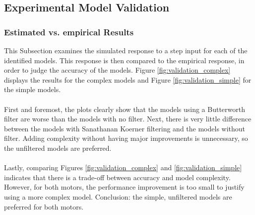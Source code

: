 \documentclass[a4paper,kul]{kulakarticle} %
\begin{document}

\subsection{Experimental Model Validation}
\label{subsec:validation}

\subsubsection{Estimated vs. empirical Results}

This Subsection examines the simulated response to a step input for each of the identified models. This response is then compared to the empirical response, in order to judge the accuracy of the models. Figure \ref{fig:validation_complex} displays the results for the complex models and Figure \ref{fig:validation_simple} for the simple models. 
\\\\
First and foremost, the plots clearly show that the models using a Butterworth filter are worse than the models with no filter. Next, there is very little difference between the models with Sanathanan Koerner filtering and the models without filter. Adding complexity without having major improvements is unnecessary, so the unfiltered models are preferred.
\\\\
Lastly, comparing Figures \ref{fig:validation_complex} and \ref{fig:validation_simple} indicates that there is a trade-off between accuracy and model complexity. However, for both motors, the performance improvement is too small to justify using a more complex model. Conclusion: the simple, unfiltered models are preferred for both motors.
\end{document}
